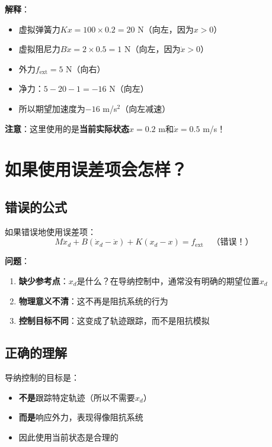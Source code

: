 \documentclass[12pt,a4paper]{article}
\begin{document}
\textbf{解释}：
\begin{itemize}
\item 虚拟弹簧力$Kx = 100 \times 0.2 = 20$ N（向左，因为$x > 0$）
\item 虚拟阻尼力$B\dot{x} = 2 \times 0.5 = 1$ N（向左，因为$\dot{x} > 0$）
\item 外力$f_{\text{ext}} = 5$ N（向右）
\item 净力：$5 - 20 - 1 = -16$ N（向左）
\item 所以期望加速度为$-16$ m/s$^2$（向左减速）
\end{itemize}

\textbf{注意}：这里使用的是\textbf{当前实际状态}$x = 0.2$ m和$\dot{x} = 0.5$ m/s！

\section{如果使用误差项会怎样？}

\subsection{错误的公式}

如果错误地使用误差项：
\begin{equation}
M\ddot{x}_d + B(\dot{x}_d - \dot{x}) + K(x_d - x) = f_{\text{ext}} \quad \text{（错误！）}
\end{equation}

\textbf{问题}：
\begin{enumerate}
\item \textbf{缺少参考点}：$x_d$是什么？在导纳控制中，通常没有明确的期望位置$x_d$
\item \textbf{物理意义不清}：这不再是阻抗系统的行为
\item \textbf{控制目标不同}：这变成了轨迹跟踪，而不是阻抗模拟
\end{enumerate}

\subsection{正确的理解}

导纳控制的目标是：
\begin{itemize}
\item \textbf{不是}跟踪特定轨迹（所以不需要$x_d$）
\item \textbf{而是}响应外力，表现得像阻抗系统
\item 因此使用当前状态是合理的
\end{itemize}
\end{document}

